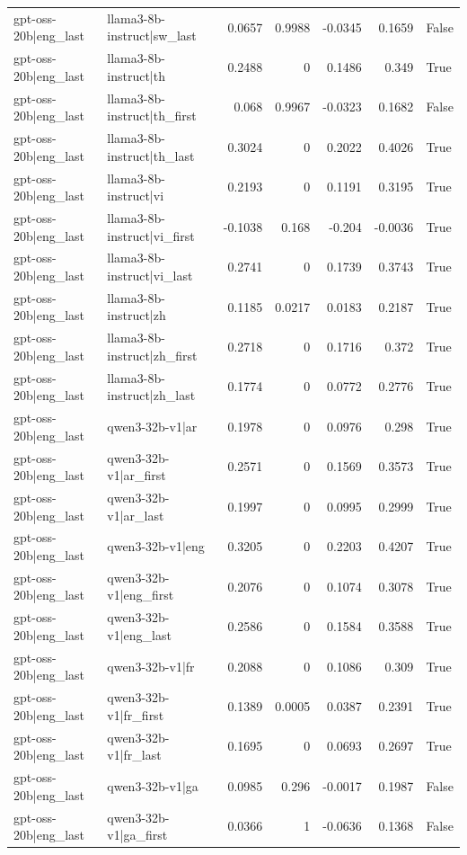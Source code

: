 \begin{table}
\begin{tabular}{l l r r r r l}
gpt-oss-20b|eng_last & llama3-8b-instruct|sw_last & 0.0657 & 0.9988 & -0.0345 & 0.1659 & False \\
gpt-oss-20b|eng_last & llama3-8b-instruct|th & 0.2488 & 0 & 0.1486 & 0.349 & True \\
gpt-oss-20b|eng_last & llama3-8b-instruct|th_first & 0.068 & 0.9967 & -0.0323 & 0.1682 & False \\
gpt-oss-20b|eng_last & llama3-8b-instruct|th_last & 0.3024 & 0 & 0.2022 & 0.4026 & True \\
gpt-oss-20b|eng_last & llama3-8b-instruct|vi & 0.2193 & 0 & 0.1191 & 0.3195 & True \\
gpt-oss-20b|eng_last & llama3-8b-instruct|vi_first & -0.1038 & 0.168 & -0.204 & -0.0036 & True \\
gpt-oss-20b|eng_last & llama3-8b-instruct|vi_last & 0.2741 & 0 & 0.1739 & 0.3743 & True \\
gpt-oss-20b|eng_last & llama3-8b-instruct|zh & 0.1185 & 0.0217 & 0.0183 & 0.2187 & True \\
gpt-oss-20b|eng_last & llama3-8b-instruct|zh_first & 0.2718 & 0 & 0.1716 & 0.372 & True \\
gpt-oss-20b|eng_last & llama3-8b-instruct|zh_last & 0.1774 & 0 & 0.0772 & 0.2776 & True \\
gpt-oss-20b|eng_last & qwen3-32b-v1|ar & 0.1978 & 0 & 0.0976 & 0.298 & True \\
gpt-oss-20b|eng_last & qwen3-32b-v1|ar_first & 0.2571 & 0 & 0.1569 & 0.3573 & True \\
gpt-oss-20b|eng_last & qwen3-32b-v1|ar_last & 0.1997 & 0 & 0.0995 & 0.2999 & True \\
gpt-oss-20b|eng_last & qwen3-32b-v1|eng & 0.3205 & 0 & 0.2203 & 0.4207 & True \\
gpt-oss-20b|eng_last & qwen3-32b-v1|eng_first & 0.2076 & 0 & 0.1074 & 0.3078 & True \\
gpt-oss-20b|eng_last & qwen3-32b-v1|eng_last & 0.2586 & 0 & 0.1584 & 0.3588 & True \\
gpt-oss-20b|eng_last & qwen3-32b-v1|fr & 0.2088 & 0 & 0.1086 & 0.309 & True \\
gpt-oss-20b|eng_last & qwen3-32b-v1|fr_first & 0.1389 & 0.0005 & 0.0387 & 0.2391 & True \\
gpt-oss-20b|eng_last & qwen3-32b-v1|fr_last & 0.1695 & 0 & 0.0693 & 0.2697 & True \\
gpt-oss-20b|eng_last & qwen3-32b-v1|ga & 0.0985 & 0.296 & -0.0017 & 0.1987 & False \\
gpt-oss-20b|eng_last & qwen3-32b-v1|ga_first & 0.0366 & 1 & -0.0636 & 0.1368 & False \\

\end{tabular}
\end{table}
